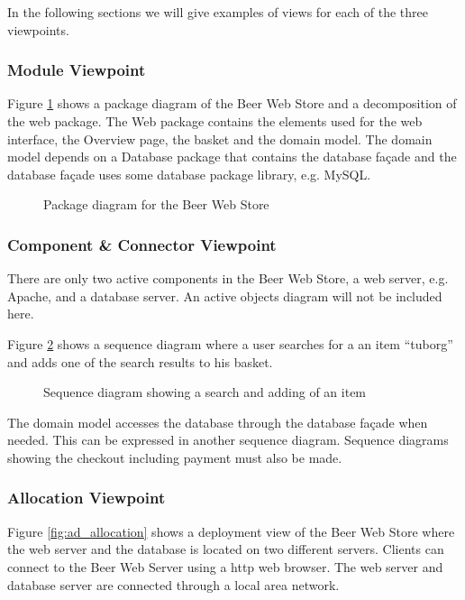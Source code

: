 In the following sections we will give examples of views for each
of the three viewpoints.

\subsubsection{Module Viewpoint}

Figure \ref{fig:ad_package} shows a package diagram of the Beer Web
Store and a decomposition of the web package. The Web package
contains the elements used for the web interface, 
the Overview page, the basket and the domain model. The domain model
depends on a Database package that contains the database fa\c cade and the
database fa\c cade uses some database package library, e.g. MySQL.

\begin{figure}[!htb]
\centerline{}
\caption{Package diagram for the Beer Web Store}
\label{fig:ad_package}
\end{figure}

\subsubsection{Component \& Connector Viewpoint}

There are only two active components in the Beer Web Store, a web server,
e.g. Apache, and a database server. An active objects diagram will
not be included here.

Figure \ref{fig:ad_sequence} shows a sequence diagram where a user searches
for a an item ``tuborg'' and adds one of the search results to his basket.

\begin{figure}[!htb]
\centerline{}
\caption{Sequence diagram showing a search and adding of an item}
\label{fig:ad_sequence}
\end{figure}

The domain model accesses the database through the database fa\c cade
when needed. This can be expressed in another sequence diagram.
Sequence diagrams showing the checkout including payment must
also be made.

\subsubsection{Allocation Viewpoint}

Figure \ref{fig:ad_allocation} shows a deployment view of the Beer
Web Store where the web server and the database is located on two
different servers. Clients can connect to the Beer Web Server
using a http web browser. The web server and database server
are connected through a local area network.


